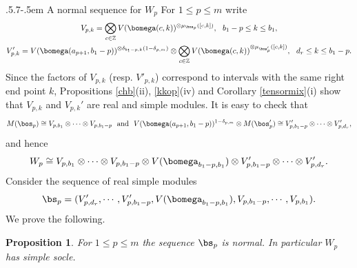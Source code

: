 \documentclass[11pt,reqno]{amsart}
\makeatletter
\newtheorem*{prop}{Proposition}
\theoremstyle{definition} \newtheorem*{defn}{Definition}
\theoremstyle{definition}
\numberwithin{equation}{section}
\def\subsection{\def\@secnumfont{\bfseries}\@startsection{subsection}{2}%
  {\parindent}{.5\linespacing\@plus.7\linespacing}{-.5em}%
  {\normalfont\bfseries}}
\makeatother
\begin{document}
\subsection{A normal sequence for $W_p$} For  $1\leq p\leq m$ write
\begin{gather*}V_{p,k} = \bigotimes_{c\in \mathbb Z} V(\bomega(c,k))^{\otimes\mu_{\bos_p}([c,k])}, \ \ b_1-p\leq k\leq b_1,\\
V_{p,k}'= V(\bomega(a_{p+1},b_1-p))^{\otimes\delta_{b_1-p,k}(1-\delta_{p,m})}\otimes \bigotimes_{c\in \mathbb Z} V(\bomega(c,k))^{\otimes\mu_{\bos_p'}([c,k])}, \ \ d_r\le k\leq b_1-p.
\end{gather*}
Since the factors of $V_{p,k}$ (resp. $V'_{p,k}$) correspond to intervals with the same right end point $k$, Propositions \ref{chb}(ii), \ref{kkop}(iv) and Corollary \ref{tensormix}(i) show that  $V_{p,k}$ and $V_{p,k}'$ are real and simple modules.
It is easy to check that
$$M(\bos_p)\cong V_{p,b_1}\otimes \cdots \otimes V_{p,b_1-p} \ \ {\rm and} \ \ V(\bomega(a_{p+1},b_1-p))^{1-\delta_{p,m}}\otimes M(\bos_p') \cong V_{p,b_1-p}'\otimes \cdots \otimes V_{p,d_r}',$$
and hence
$$W_p \cong  V_{p,b_1}\otimes \cdots \otimes V_{p,b_1-p} \otimes V(\bomega_{b_1-p,b_1})\otimes V_{p,b_1-p}'\otimes \cdots \otimes V_{p,d_r}'.$$
Consider the sequence of real simple modules
$$\bs_p = (V_{p,d_r}', \cdots, V_{p,b_1-p}', V(\bomega_{b_1-p,b_1}), V_{p,b_1-p},\cdots, V_{p,b_1}).$$
We prove the following.
\begin{prop}\label{Spnormal}
    For $1\leq p\leq m$ the sequence $\bs_p$ is normal. In particular $W_p$ has simple socle.
\end{prop}
\end{document}

